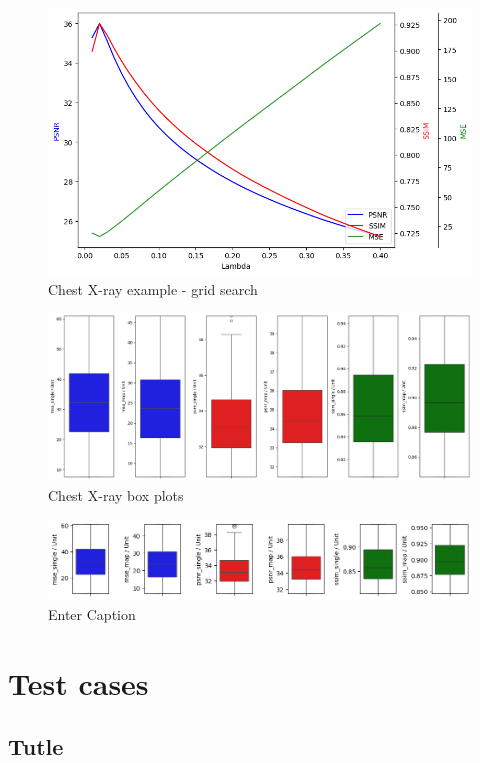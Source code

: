\documentclass[12pt]{article}
\begin{document}
\begin{figure}[h]
    \centering
    \includegraphics[width=0.6\linewidth]{images//chest_xray/chest_xray-line_plots.png}
        \caption{Chest X-ray example - grid search}
    \label{fig:enter-label}
\end{figure}

\begin{figure}[h]
    \centering
        \includegraphics[width=1\linewidth]{images//chest_xray/outputa.png}
        \caption{Chest X-ray box plots}
    \label{fig:enter-label}
\end{figure}

\begin{figure}
    \centering
    \includegraphics[width=0.5\linewidth]{images//chest_xray/output3.png}
    \caption{Enter Caption}
    \label{fig:enter-label}
\end{figure}

\section{Test cases}

\subsection{Tutle}
\end{document}
